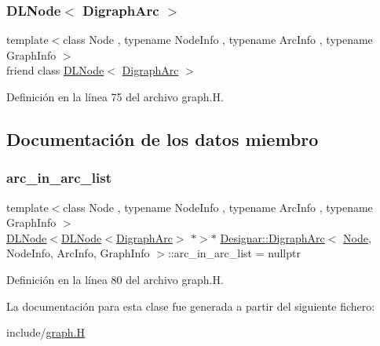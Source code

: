 \subsubsection{\texorpdfstring{D\+L\+Node$<$ Digraph\+Arc $>$}{DLNode< DigraphArc >}}
{\footnotesize\ttfamily template$<$class Node , typename Node\+Info , typename Arc\+Info , typename Graph\+Info $>$ \\
friend class \hyperlink{class_designar_1_1_d_l_node}{D\+L\+Node}$<$ \hyperlink{class_designar_1_1_digraph_arc}{Digraph\+Arc} $>$\hspace{0.3cm}{\ttfamily [friend]}}



Definición en la línea 75 del archivo graph.\+H.



\subsection{Documentación de los datos miembro}
\mbox{\label{class_designar_1_1_digraph_arc_a1b269dc44c4b3696cb79e86a97afbdd7}} 
\subsubsection{\texorpdfstring{arc\+\_\+in\+\_\+arc\+\_\+list}{arc\_in\_arc\_list}}
{\footnotesize\ttfamily template$<$class Node , typename Node\+Info , typename Arc\+Info , typename Graph\+Info $>$ \\
\hyperlink{class_designar_1_1_d_l_node}{D\+L\+Node}$<$\hyperlink{class_designar_1_1_d_l_node}{D\+L\+Node}$<$\hyperlink{class_designar_1_1_digraph_arc}{Digraph\+Arc}$>$ $\ast$$>$$\ast$ \hyperlink{class_designar_1_1_digraph_arc}{Designar\+::\+Digraph\+Arc}$<$ \hyperlink{namespace_designar_a5af326c65aa2bd26b26c410f2030d09e}{Node}, Node\+Info, Arc\+Info, Graph\+Info $>$\+::arc\+\_\+in\+\_\+arc\+\_\+list = nullptr\hspace{0.3cm}{\ttfamily [protected]}}



Definición en la línea 80 del archivo graph.\+H.



La documentación para esta clase fue generada a partir del siguiente fichero\+:\begin{DoxyCompactItemize}
\item 
include/\hyperlink{graph_8_h}{graph.\+H}\end{DoxyCompactItemize}
